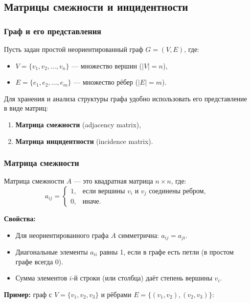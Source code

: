 \subsection{Матрицы смежности и инцидентности}

\subsubsection{Граф и его представления}

Пусть задан простой неориентированный граф $G = (V, E)$, где:
\begin{itemize}[leftmargin=*]
  \item $V = \{v_1, v_2, \dots, v_n\}$ — множество вершин ($|V| = n$),
  \item $E = \{e_1, e_2, \dots, e_m\}$ — множество рёбер ($|E| = m$).
\end{itemize}

Для хранения и анализа структуры графа удобно использовать его представление в виде матриц:
\begin{enumerate}[label=\arabic*)]
  \item \textbf{Матрица смежности} (adjacency matrix),
  \item \textbf{Матрица инцидентности} (incidence matrix).
\end{enumerate}

\subsubsection{Матрица смежности}

Матрица смежности $A$ — это квадратная матрица $n \times n$, где:
\[
  a_{ij} = \begin{cases}
    1, & \text{если вершины } v_i \text{ и } v_j \text{ соединены ребром}, \\
    0, & \text{иначе}.
  \end{cases}
\]

\textbf{Свойства:}
\begin{itemize}[leftmargin=*]
  \item Для неориентированного графа $A$ симметрична: $a_{ij} = a_{ji}$.
  \item Диагональные элементы $a_{ii}$ равны 1, если в графе есть петли (в простом графе всегда 0).
  \item Сумма элементов $i$‑й строки (или столбца) даёт степень вершины $v_i$.
\end{itemize}

\textbf{Пример:} граф с $V = \{v_1, v_2, v_3\}$ и рёбрами $E = \{(v_1,v_2), (v_2,v_3)\}$:

